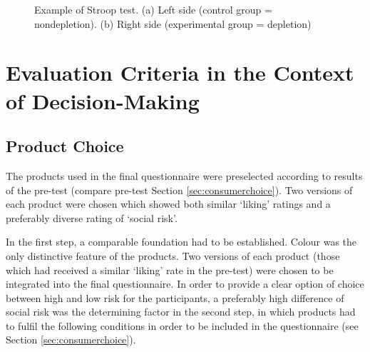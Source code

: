 \begin{figure}[h!]
  \begin{center}
    \caption{Example of Stroop test. (a) Left side (control group = nondepletion). (b) Right side (experimental group = depletion)}\label{fig:green_vs_pink}
  \end{center}
\end{figure}

\FloatBarrier

\section{Evaluation Criteria in the Context of Decision-Making}
\subsection{Product Choice}
The products used in the final questionnaire were preselected according to results of the pre-test (compare pre-test Section \ref{sec:consumerchoice}). Two versions of each product were chosen which showed both similar ‘liking’ ratings and a preferably diverse rating of ‘social risk’. \par
In the first step, a comparable foundation had to be established. Colour was the only distinctive feature of the products. Two versions of each product (those which had received a similar  ‘liking’ rate in the pre-test) were chosen to be integrated into the final questionnaire. In order to provide a clear option of choice between high and low risk for the participants, a preferably high difference of social risk was the determining factor in the second step, in which products had to fulfil the following conditions in order to be included in the questionnaire (see Section \ref{sec:consumerchoice}).\par

